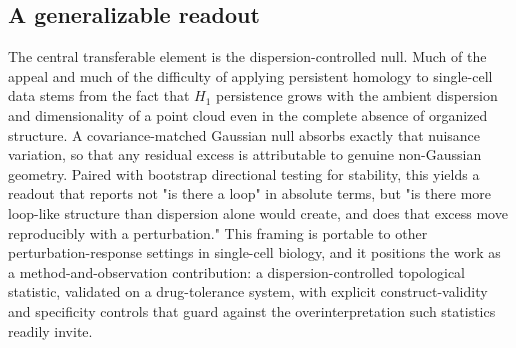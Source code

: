 \subsection*{A generalizable readout}

The central transferable element is the dispersion-controlled null. Much
of the appeal and much of the difficulty of applying persistent homology
to single-cell data stems from the fact that $H_1$ persistence grows with
the ambient dispersion and dimensionality of a point cloud even in the
complete absence of organized structure. A covariance-matched Gaussian
null absorbs exactly that nuisance variation, so that any residual excess
is attributable to genuine non-Gaussian geometry. Paired with bootstrap
directional testing for stability, this yields a readout that reports not
"is there a loop" in absolute terms, but "is there more loop-like
structure than dispersion alone would create, and does that excess move
reproducibly with a perturbation." This framing is portable to other
perturbation-response settings in single-cell biology, and it positions
the work as a method-and-observation contribution: a dispersion-controlled
topological statistic, validated on a drug-tolerance system, with explicit
construct-validity and specificity controls that guard against the
overinterpretation such statistics readily invite.
